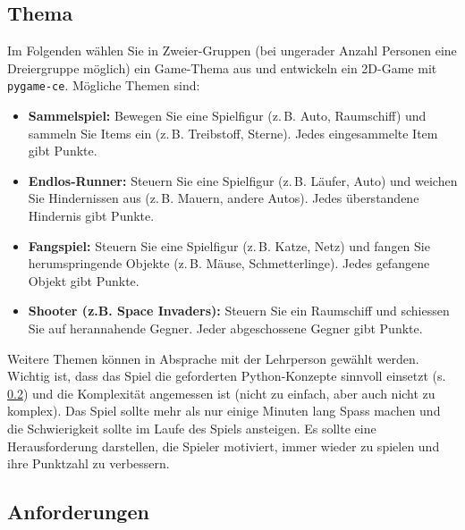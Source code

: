 \subsection{Thema}
Im Folgenden wählen Sie in Zweier-Gruppen (bei ungerader Anzahl Personen eine Dreiergruppe möglich) ein Game-Thema aus und entwickeln ein 2D-Game mit \texttt{pygame-ce}. Mögliche Themen sind:
\begin{itemize}
    \item \textbf{Sammelspiel:} Bewegen Sie eine Spielfigur (z.\,B. Auto, Raumschiff) und sammeln Sie Items ein (z.\,B. Treibstoff, Sterne). Jedes eingesammelte Item gibt Punkte.
    \item \textbf{Endlos-Runner:} Steuern Sie eine Spielfigur (z.\,B. Läufer, Auto) und weichen Sie Hindernissen aus (z.\,B. Mauern, andere Autos). Jedes überstandene Hindernis gibt Punkte.
    \item \textbf{Fangspiel:} Steuern Sie eine Spielfigur (z.\,B. Katze, Netz) und fangen Sie herumspringende Objekte (z.\,B. Mäuse, Schmetterlinge). Jedes gefangene Objekt gibt Punkte.
    \item \textbf{Shooter (z.B. Space Invaders):} Steuern Sie ein Raumschiff und schiessen Sie auf herannahende Gegner. Jeder abgeschossene Gegner gibt Punkte.
\end{itemize}

Weitere Themen können in Absprache mit der Lehrperson gewählt werden. Wichtig ist, dass das Spiel die geforderten Python-Konzepte sinnvoll einsetzt (s. \cref{sec:anforderungen}) und die Komplexität angemessen ist (nicht zu einfach, aber auch nicht zu komplex). Das Spiel sollte mehr als nur einige Minuten lang Spass machen und die Schwierigkeit sollte im Laufe des Spiels ansteigen. Es sollte eine Herausforderung darstellen, die Spieler motiviert, immer wieder zu spielen und ihre Punktzahl zu verbessern.

\subsection{Anforderungen}\label{sec:anforderungen}

